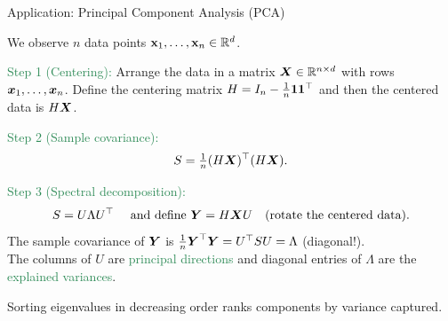 \documentclass[11pt,aspectratio=169]{beamer}
\begin{document}
\begin{frame}{Application: Principal Component Analysis (PCA)} 
\begin{small}
We observe $n$ data points ${\bf x}_1,\ldots,{\bf x}_n \in \mathbb R^d$.  
\medskip

\textcolor{SeaGreen}{Step 1 (Centering):} Arrange the data in a matrix $\boldsymbol X\in \mathbb R^{n\times d}$ with rows $\boldsymbol x_1,\ldots,\boldsymbol x_n$. Define the centering matrix $H=I_n-\tfrac{1}{n}{\bf 1}{\bf 1}^\top $ and 
then the \alert{centered data} is $H\boldsymbol X$.
\bigskip

\textcolor{SeaGreen}{Step 2 (Sample covariance):} 
\[
S=\tfrac{1}{n}(H\boldsymbol X)^\top  (H\boldsymbol X).
\]
\medskip

\textcolor{SeaGreen}{Step 3 (Spectral decomposition):}  
\[
S = U \Lambda U^\top\quad\mbox{ and define } \boldsymbol Y=H\boldsymbol XU \quad \mbox{(rotate the centered data)}.
\]
The sample covariance of $\boldsymbol Y$ is $\tfrac1n \boldsymbol Y^\top \boldsymbol Y=U^\top  S U=\Lambda$ (diagonal!).\\[3mm]

The columns of $U$ are \textcolor{SeaGreen}{principal directions} and diagonal entries of $\Lambda$ are the \textcolor{SeaGreen}{explained variances}.
\medskip

Sorting eigenvalues in decreasing order ranks components by variance captured.  
\end{small}
\end{frame}
\end{document}
